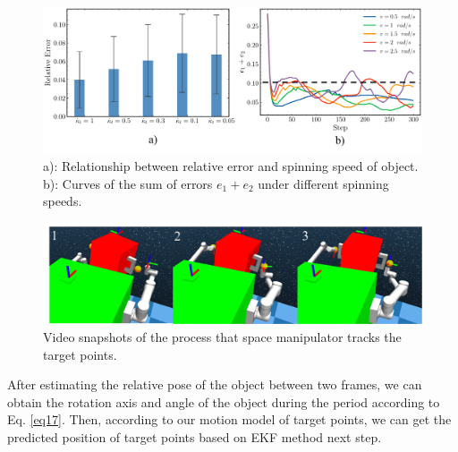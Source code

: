 \documentclass{article}
\begin{document}
\begin{figure}[t]
  \centering
  \includegraphics[width=\hsize]{figs/Fig5.pdf}
  \caption{a): Relationship between relative error and spinning speed of object. b): Curves of the sum of errors $e_1+e_2$ under different spinning speeds.}
  \label{fig5}
\end{figure}

\begin{figure}[!t]
  \centering
  \includegraphics[width=\hsize]{figs/Fig6.pdf}
  \caption{Video snapshots of the process that space manipulator tracks the target points.}
  \label{fig6}
\end{figure}

After estimating the relative pose of the object between two frames, we can obtain the rotation axis and angle of the object during the period according to Eq. \eqref{eq17}. Then, according to our motion model of target points, we can get the predicted position of target points based on EKF method next step. 
\end{document}
